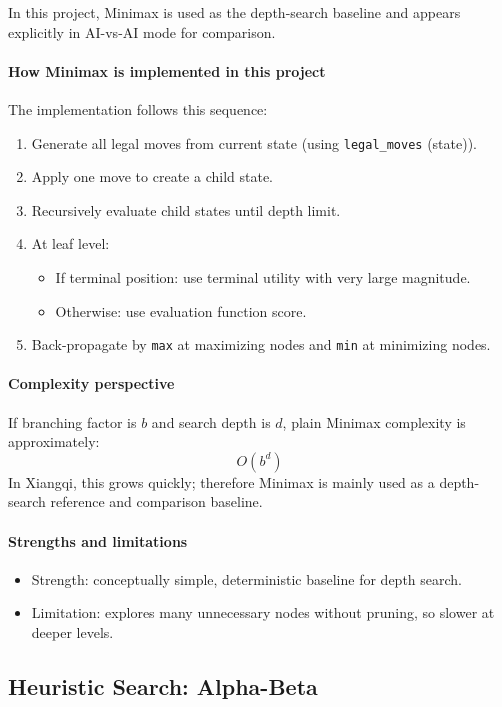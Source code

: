 \documentclass[a4paper,12pt]{article}
\begin{document}
In this project, Minimax is used as the depth-search baseline and appears explicitly in AI-vs-AI mode for comparison.

\paragraph{How Minimax is implemented in this project}
The implementation follows this sequence:
\begin{enumerate}
  \item Generate all legal moves from current state (using \texttt{legal\_moves} (state)).
  \item Apply one move to create a child state.
  \item Recursively evaluate child states until depth limit.
  \item At leaf level:
  \begin{itemize}
    \item If terminal position: use terminal utility with very large magnitude.
    \item Otherwise: use evaluation function score.
  \end{itemize}
  \item Back-propagate by \texttt{max} at maximizing nodes and \texttt{min} at minimizing nodes.
\end{enumerate}

\paragraph{Complexity perspective}
If branching factor is $b$ and search depth is $d$, plain Minimax complexity is approximately:
\[
O(b^d)
\]
In Xiangqi, this grows quickly; therefore Minimax is mainly used as a depth-search reference and comparison baseline.

\paragraph{Strengths and limitations}
\begin{itemize}
  \item Strength: conceptually simple, deterministic baseline for depth search.
  \item Limitation: explores many unnecessary nodes without pruning, so slower at deeper levels.
\end{itemize}

\subsection{Heuristic Search: Alpha-Beta}
\end{document}
